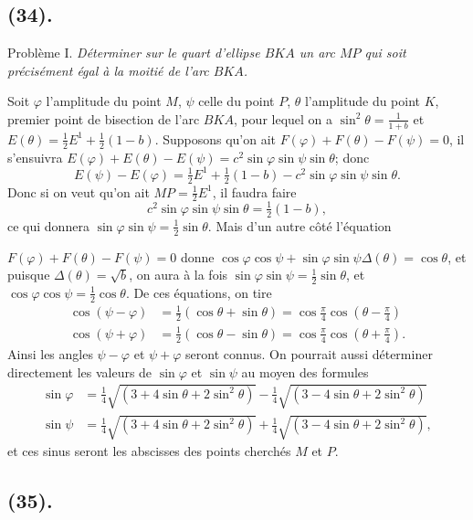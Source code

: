 \documentclass{article}
\begin{document}
\subsection*{(34).}

Problème I. \emph{Déterminer sur le quart d'ellipse $BKA$ un arc $MP$ qui soit précisément égal à la moitié de l'arc $BKA$.}

Soit $\varphi$ l'amplitude du point $M$, $\psi$ celle du point $P$, $\theta$ l'amplitude du point $K$, premier point de bisection de l'arc $BKA$, pour lequel on a $\sin^{2}\theta=\frac{1}{1+b}$ et $E(\theta)=\frac{1}{2}E^{1}+\frac{1}{2}(1-b)$. Supposons qu'on ait $F(\varphi)+F(\theta)-F(\psi)=0$, il s'ensuivra $E(\varphi)+E(\theta)-E(\psi)=c^{2}\sin\varphi\sin\psi\sin\theta$; donc
\[ E(\psi)-E(\varphi)=\tfrac{1}{2}E^{1}+\tfrac{1}{2}(1-b)-c^{2}\sin\varphi\sin\psi\sin\theta. \]
Donc si on veut qu'on ait $MP=\frac{1}{2}E^{1}$, il faudra faire
\[ c^{2}\sin\varphi\sin\psi\sin\theta=\tfrac{1}{2}(1-b), \]
ce qui donnera $\sin\varphi\sin\psi=\frac{1}{2}\sin\theta$. Mais d'un autre côté l'équation

$F(\varphi)+F(\theta)-F(\psi)=0$ donne $\cos\varphi\cos\psi+\sin\varphi\sin\psi\Delta(\theta)=\cos\theta$, et puisque $\Delta(\theta)=\sqrt{b}$, on aura à la fois $\sin\varphi\sin\psi=\frac{1}{2}\sin\theta$, et $\cos\varphi\cos\psi=\frac{1}{2}\cos\theta$. De ces équations, on tire
\[ \begin{aligned} \cos(\psi-\varphi)&=\tfrac{1}{2}(\cos\theta+\sin\theta)=\cos\frac{\pi}{4}\cos\left(\theta-\frac{\pi}{4}\right)\\ \cos(\psi+\varphi)&=\tfrac{1}{2}(\cos\theta-\sin\theta)=\cos\frac{\pi}{4}\cos\left(\theta+\frac{\pi}{4}\right). \end{aligned} \]
Ainsi les angles $\psi-\varphi$ et $\psi+\varphi$ seront connus. On pourrait aussi déterminer directement les valeurs de $\sin\varphi$ et $\sin\psi$ au moyen des formules
\[ \begin{aligned} \sin\varphi&=\tfrac{1}{4}\sqrt{(3+4\sin\theta+2\sin^{2}\theta)}-\tfrac{1}{4}\sqrt{(3-4\sin\theta+2\sin^{2}\theta)}\\ \sin\psi&=\tfrac{1}{4}\sqrt{(3+4\sin\theta+2\sin^{2}\theta)}+\tfrac{1}{4}\sqrt{(3-4\sin\theta+2\sin^{2}\theta)}, \end{aligned} \]
et ces sinus seront les abscisses des points cherchés $M$ et $P$.

\subsection*{(35).}
\end{document}

